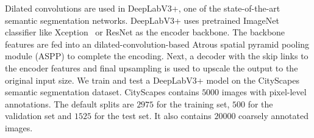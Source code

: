 \documentclass[10pt,twocolumn,letterpaper]{article}
\begin{document}
Dilated convolutions are used in DeepLabV3+\cite{chen2018encoder}, one of the state-of-the-art semantic segmentation networks. DeepLabV3+ uses pretrained ImageNet classifier like Xception~\cite{szegedy2015going} or ResNet as the encoder backbone. The backbone features are fed into an dilated-convolution-based Atrous spatial pyramid pooling module (ASPP) to complete the encoding. Next, a decoder with the skip links to the encoder features and final upsampling is used to upscale the output to the original input size. We train and test a DeepLabV3+ model on the CityScapes semantic segmentation dataset. CityScapes contains $5000$ images with pixel-level annotations. The default splits are $2975$ for the training set, $500$ for the validation set and $1525$ for the test set. It also contains $20000$ coarsely annotated images. 
\end{document}
